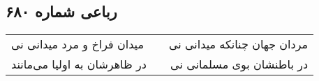 \begin{center}
\section*{رباعی شماره ۶۸۰}
\label{sec:sh680}
\begin{longtable}{l p{0.5cm} r}
میدان فراخ و مرد میدانی نی
&&
مردان جهان چنانکه میدانی نی
\\
در ظاهرشان به اولیا می‌مانند
&&
در باطنشان بوی مسلمانی نی
\\
\end{longtable}
\end{center}
